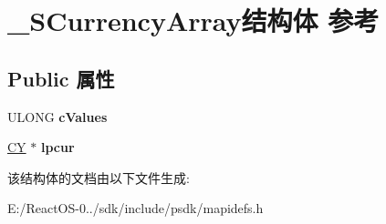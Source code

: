 \hypertarget{struct___s_currency_array}{}\section{\+\_\+\+S\+Currency\+Array结构体 参考}
\label{struct___s_currency_array}
\subsection*{Public 属性}
\begin{DoxyCompactItemize}
\item 
\mbox{\label{struct___s_currency_array_aaafe01a6bc1e033678e230efe5aed9fd}} 
U\+L\+O\+NG {\bfseries c\+Values}
\item 
\mbox{\label{struct___s_currency_array_ac855b156ed2ff5bc7ecff14f7994dc67}} 
\hyperlink{uniontag_c_y}{CY} $\ast$ {\bfseries lpcur}
\end{DoxyCompactItemize}


该结构体的文档由以下文件生成\+:\begin{DoxyCompactItemize}
\item 
E\+:/\+React\+O\+S-\/0../sdk/include/psdk/mapidefs.\+h\end{DoxyCompactItemize}
